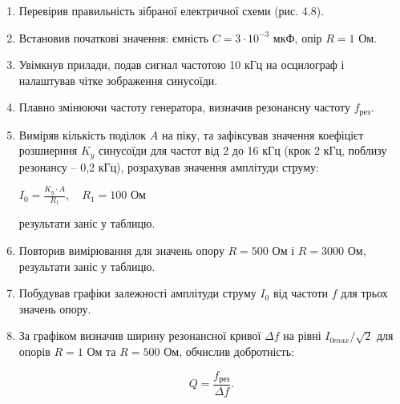 \documentclass[12pt, a4paper]{article}
\begin{document}
    \begin{enumerate}
        \item Перевірив правильність зібраної електричної схеми (рис. 4.8).
    
        \item Встановив початкові значення: ємність $C = 3\cdot10^{-3}$ мкФ, опір $R = 1$ Ом.
    
        \item Увімкнув прилади, подав сигнал частотою 10 кГц на осцилограф і налаштував чітке зображення синусоїди.
    
        \item Плавно змінюючи частоту генератора, визначив резонансну частоту $f_{\text{рез}}$.
    
        \item Виміряв кількість поділок $A$ на піку, та зафіксував значення коефіцієт розшиерння $K_y$ синусоїди для частот від 2 до 16 кГц (крок 2 кГц, поблизу резонансу – 0,2 кГц), розрахував значення амплітуди струму:

        \vspace{-0.5em}

        \begin{center}
            $\displaystyle I_0 = \frac{K_y \cdot A}{R_1}, \quad R_1 = 100$ Ом
        \end{center}

        \vspace{-0.5em}

        результати заніс у таблицю.
    
        \item Повторив вимірювання для значень опору $R = 500$ Ом і $R = 3000$ Ом, результати заніс у таблицю.
    
        \item Побудував графіки залежності амплітуди струму $I_0$ від частоти $f$ для трьох значень опору.
    
        \item За графіком визначив ширину резонансної кривої $\Delta f$ на рівні $I_{0 max}/\sqrt{2}$ для опорів $R = 1$ Ом та $R = 500$ Ом, обчислив добротність:
        
        \begin{equation}
            Q = \frac{f_{\text{рез}}}{\Delta f}.
            \tag{4.п1}
        \end{equation}

    \end{enumerate}
\end{document}
